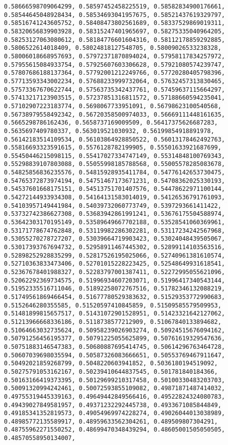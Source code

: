 \documentclass[11pt]{article}
\begin{document}
\begin{Verbatim}[commandchars=\\\{\}]
0.58666598709064299, 0.58597452458225519, 0.58582834900176661, 0.58544645048928434, 0.58534693041957675, 0.58521437619329797, 0.58516741243605752, 0.58408473802561689, 0.58337529869019311, 0.58320656839903928, 0.58315247401965697, 0.58275335040964205, 0.58253127063080612, 0.58184776601604316, 0.58112178859292885, 0.5806522614018409, 0.58024818127548705, 0.58009026533238328, 0.58006018668957693, 0.57972371870894024, 0.57958117834257972, 0.57955615084933754, 0.57925607603306628, 0.57921080574239747, 0.57807686188137364, 0.57792001212249766, 0.57720280405798396, 0.57713593343002234, 0.57688233999732064, 0.57632457313830465, 0.57573367670622744, 0.57563735342437761, 0.57459637115664297, 0.57413217123903515, 0.57237851316811572, 0.57188660594235041, 0.57102907223183774, 0.5698067733951091, 0.56798623100540568, 0.56738979558492342, 0.56720358500974033, 0.56669111448161635, 0.5665298786162436, 0.5658737169009509, 0.56417375626687283, 0.5635697409780337, 0.563019521030932, 0.56199854918891978, 0.56142183514109534, 0.56103864928850522, 0.56013178462492763, 0.55816693323591615, 0.5576128782199905, 0.55501633921687699, 0.55450446215098115, 0.55417027334747149, 0.55314848100769343, 0.55298839107803088, 0.55055998185788568, 0.55005578285083678, 0.54825856836235576, 0.54815928935411784, 0.54776142653730475, 0.54765372873974194, 0.54751467173671231, 0.54708362025330193, 0.54537601668175151, 0.54513751701407576, 0.54478622971100144, 0.54272144933934308, 0.54164131583014019, 0.54126536791761093, 0.54103957149441984, 0.54039732060773749, 0.5397293661411422, 0.53732742386627308, 0.53683942861991241, 0.53676175504588974, 0.53642303170195149, 0.53589649667702188, 0.53528541060369961, 0.53171778674762848, 0.53119982286302281, 0.53117234242567968, 0.53055270278727207, 0.53039664719903423, 0.53024048439505067, 0.53017393767694732, 0.52958911467445302, 0.52899114103563516, 0.52898252928835299, 0.52817526195025066, 0.52740961381610574, 0.52710363833473406, 0.52701015228223425, 0.52548649931618541, 0.52367678401988327, 0.52283797001387411, 0.52272995055621096, 0.52062292369734575, 0.51996934607203071, 0.51996417340543144, 0.51952335516711046, 0.51892258072767516, 0.51782346132088219, 0.51749561869466454, 0.51677780529383632, 0.51529353772990683, 0.5152646280355585, 0.51520597410845859, 0.51509585579509953, 0.51481899815657517, 0.51431072901528951, 0.51423321642127062, 0.51213966668336186, 0.5118738577212909, 0.51067840133894682, 0.51064663032735624, 0.50958239026903274, 0.50924515676094162, 0.50791256456195377, 0.50791225055625899, 0.50761619329547636, 0.50751883146547383, 0.50680887695414745, 0.50614296763464728, 0.50607039698035594, 0.50587326083666651, 0.50553769467911647, 0.50492021859268799, 0.5048220603941852, 0.5036180194519092, 0.50275791053162167, 0.50239410644837545, 0.501781840184366, 0.50163166419373395, 0.50129699210317458, 0.50100330483203703, 0.50091320994242461, 0.50072593855109082, 0.49871871487414032, 0.49755319445339163, 0.49649442849566416, 0.49522824324080783, 0.49439027849581957, 0.49371232292445738, 0.4933671085844849, 0.49185341352819573, 0.49054969974228274, 0.49026044013038989, 0.48985772135589917, 0.48959633562304261, 0.489509807304291, 0.48755962271550252, 0.48699470348439294, 0.48605001505050505, 0.48570558950134007, 
\end{Verbatim}
\end{document}
